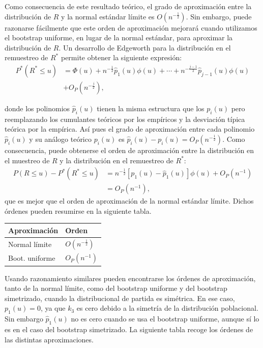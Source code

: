 \documentclass[
]{book}
\newcounter{none} %
\theoremstyle{break}
\theoremstyle{nonumberplain}
\begin{document}
Como consecuencia de este resultado teórico, el grado de aproximación
entre la distribución de \(R\) y la normal estándar límite es
\(O (n^{-\frac{1}{2}})\). Sin embargo, puede razonarse
fácilmente que este orden de aproximación mejorará cuando utilizamos el
bootstrap uniforme, en lugar de la normal estándar, para aproximar la
distribución de \(R\). Un desarrollo de Edgeworth para la distribución en
el remuestreo de \(R^{\ast}\) permite obtener la siguiente expresión:
\[\begin{aligned}
P^{\ast}\left( R^{\ast}\leq u \right) &= \Phi \left( u \right) +n^{-\frac{1}{2}
}\hat{p}_1\left( u \right) \phi \left( u \right) +\cdots +n^{-\frac{j-1}{2}}
\hat{p}_{j-1}\left( u \right) \phi \left( u \right) \\
&+ O_{P}\left( n^{-\frac{j}{2}} \right),
\end{aligned}\]

donde los polinomios \(\hat{p}_i\left( u \right)\) tienen la misma
estructura que los \(p_i\left( u \right)\) pero reemplazando los
cumulantes teóricos por los empíricos y la desviación típica teórica por
la empírica. Así pues el grado de aproximación entre cada polinomio
\(\hat{p}_i( u )\) y su análogo teórico \(p_i( u )\) es
\(\hat{p}_i( u ) -p_i( u ) = O_{P}( n^{-\frac{1}{2}} )\).
Como consecuencia, puede obtenerse el orden de aproximación entre la distribución
en el muestreo de \(R\) y la distribución en el remuestreo de \(R^{\ast}\):
\[\begin{aligned}
P\left( R\leq u \right) -P^{\ast}\left( R^{\ast}\leq u \right) &=  n^{-\frac{1}{
2}}\left[ p_1\left( u \right) -\hat{p}_1\left( u \right) \right] \phi
\left( u \right) +O_{P}\left( n^{-1} \right) \\
&=  O_{P}\left( n^{-1} \right),\end{aligned}\]que es mejor que el orden
de aproximación de la normal estándar límite. Dichos órdenes pueden
resumirse en la siguiente tabla.

{\def\LTcaptype{none} %
\begin{longtable}[]{@{}ll@{}}
\toprule\noalign{}
Aproximación & Orden \\
\midrule\noalign{}
\endhead
\bottomrule\noalign{}
\endlastfoot
Normal límite & \(O\left( n^{-\frac{1}{2}} \right)\) \\
Boot. uniforme & \(O_{P}\left( n^{-1} \right)\) \\
\end{longtable}
}

Usando razonamiento similares pueden encontrarse los órdenes de
aproximación, tanto de la normal límite, como del bootstrap uniforme y
del bootstrap simetrizado, cuando la distribucional de partida es
simétrica. En ese caso, \(p_1\left( u \right) =0\), ya que \(k_3\) es
cero debido a la simetría de la distribución poblacional. Sin embargo
\(\hat{p}_1\left( u \right)\) no es cero cuando se usa el bootstrap
uniforme, aunque sí lo es en el caso del bootstrap simetrizado. La
siguiente tabla recoge los órdenes de las distintas aproximaciones.
\end{document}
